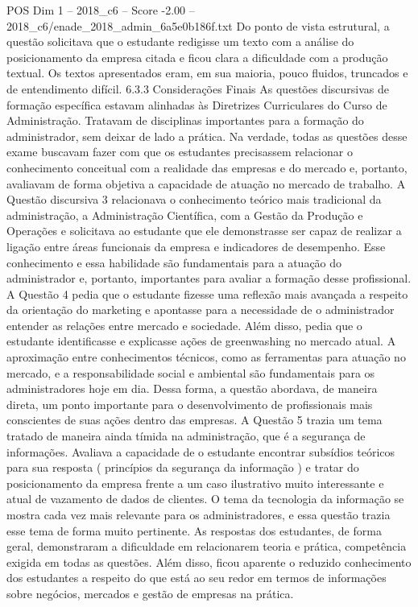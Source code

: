 \begin{textsample}{POS Dim 1 – 2018\_c6 – Score -2.00 – 2018\_c6/enade\_2018\_admin\_6a5e0b186f.txt}
Do ponto de vista estrutural, a questão solicitava que o estudante redigisse um texto com a análise do posicionamento da empresa citada e ficou clara a dificuldade com a produção textual.
Os textos apresentados eram, em sua maioria, pouco fluidos, truncados e de entendimento difícil. 6.3.3 Considerações Finais As questões discursivas de formação específica estavam alinhadas às Diretrizes Curriculares do Curso de Administração.
Tratavam de disciplinas importantes para a formação do administrador, sem deixar de lado a prática.
Na verdade, todas as questões desse exame buscavam fazer com que os estudantes precisassem relacionar o conhecimento conceitual com a realidade das empresas e do mercado e, portanto, avaliavam de forma objetiva a capacidade de atuação no mercado de trabalho.
A Questão discursiva 3 relacionava o conhecimento teórico mais tradicional da administração, a Administração Científica, com a Gestão da Produção e Operações e solicitava ao estudante que ele demonstrasse ser capaz de realizar a ligação entre áreas funcionais da empresa e indicadores de desempenho.
Esse conhecimento e essa habilidade são fundamentais para a atuação do administrador e, portanto, importantes para avaliar a formação desse profissional.
A Questão 4 pedia que o estudante fizesse uma reflexão mais avançada a respeito da orientação do marketing e apontasse para a necessidade de o administrador entender as relações entre mercado e sociedade.
Além disso, pedia que o estudante identificasse e explicasse ações de greenwashing no mercado atual.
A aproximação entre conhecimentos técnicos, como as ferramentas para atuação no mercado, e a responsabilidade social e ambiental são fundamentais para os administradores hoje em dia.
Dessa forma, a questão abordava, de maneira direta, um ponto importante para o desenvolvimento de profissionais mais conscientes de suas ações dentro das empresas.
A Questão 5 trazia um tema tratado de maneira ainda tímida na administração, que é a segurança de informações.
Avaliava a capacidade de o estudante encontrar subsídios teóricos para sua resposta ( princípios da segurança da informação ) e tratar do posicionamento da empresa frente a um caso ilustrativo muito interessante e atual de vazamento de dados de clientes.
O tema da tecnologia da informação se mostra cada vez mais relevante para os administradores, e essa questão trazia esse tema de forma muito pertinente.
As respostas dos estudantes, de forma geral, demonstraram a dificuldade em relacionarem teoria e prática, competência exigida em todas as questões.
Além disso, ficou aparente o reduzido conhecimento dos estudantes a respeito do que está ao seu redor em termos de informações sobre negócios, mercados e gestão de empresas na prática.

\end{textsample}
